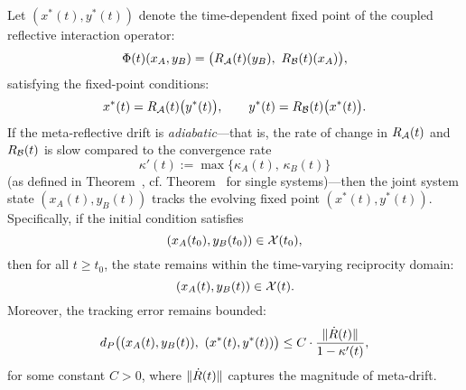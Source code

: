 \begin{corollary}
\label{corollary:bk7_fixed_point_tracking_within_evolving_reciprocity}
Let \( (x^*(t), y^*(t)) \) denote the time-dependent fixed point of the coupled reflective interaction operator:
\[
\Phi(t)(x_A, y_B) = \big( R_{\mathcal{A}}(t)(y_B),\ R_{\mathcal{B}}(t)(x_A) \big),
\]
satisfying the fixed-point conditions:
\[
x^*(t) = R_{\mathcal{A}}(t)\big(y^*(t)\big), 
\qquad 
y^*(t) = R_{\mathcal{B}}(t)\big(x^*(t)\big).
\]
If the meta-reflective drift is \emph{adiabatic}—that is, the rate of change in 
\( R_{\mathcal{A}}(t) \) and \( R_{\mathcal{B}}(t) \) is slow compared to the 
convergence rate 
\[
\kappa'(t) := \max\{ \kappa_A(t),\, \kappa_B(t) \}
\]
(as defined in Theorem~, cf. Theorem~ 
for single systems)—then the joint system state \( (x_A(t), y_B(t)) \) tracks 
the evolving fixed point \( (x^*(t), y^*(t)) \).
Specifically, if the initial condition satisfies
\[
(x_A(t_0), y_B(t_0)) \in \mathcal{X}(t_0),
\]
then for all \( t \geq t_0 \), the state remains within the time-varying reciprocity domain:
\[
(x_A(t), y_B(t)) \in \mathcal{X}(t).
\]
Moreover, the tracking error remains bounded:
\[
d_P\big( (x_A(t), y_B(t)),\ (x^*(t), y^*(t)) \big)
\le C \cdot \frac{\|\dot{R}(t)\|}{1 - \kappa'(t)},
\]
for some constant \( C > 0 \), where \( \|\dot{R}(t)\| \) captures the magnitude of meta-drift.
\end{corollary}
